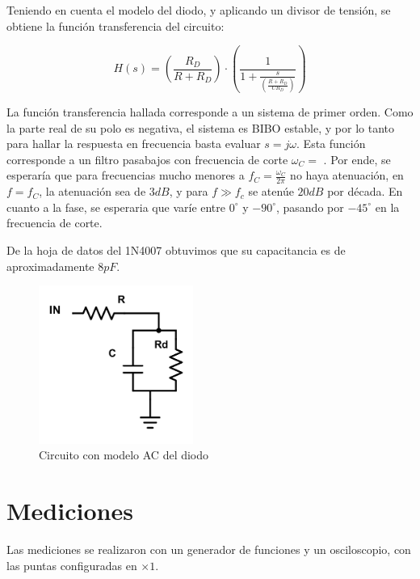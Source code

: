 \documentclass[../../e1_tp1_main.tex]{subfiles}
\begin{document}
Teniendo en cuenta el modelo del diodo, y aplicando un divisor de tensión, se obtiene la funci\'on transferencia del circuito:

\begin{equation}
H(s)= \left(\frac{R_D}{R + R_D} \right) \cdot \left( \frac{1}{1+ \frac{s}{\left(\frac{R+R_D}{C R_D}\right)}}\right)
\end{equation}

La funci\'on transferencia hallada corresponde a un sistema de primer orden. Como la parte real de su polo es negativa, el sistema es BIBO estable, y por lo tanto para hallar la respuesta en frecuencia basta evaluar $s=j\omega$. Esta funci\'on corresponde a un filtro pasabajos con frecuencia de corte $\omega_C = $ . Por ende, se esperar\'ia que para frecuencias mucho menores a $f_C = \frac{\omega_C}{2\pi}$ no haya atenuaci\'on, en $f = f_C$, la atenuaci\'on sea de $3dB$, y para $f\gg f_c$ se aten\'ue $20dB$ por d\'ecada. En cuanto a la fase, se esperaria que var\'ie entre $0^\circ$  y $-90^\circ$, pasando por $-45^\circ$ en la frecuencia de corte. \par

De la hoja de datos del 1N4007 obtuvimos que su capacitancia es de aproximadamente $8pF$.

\begin{figure}[H]
\centering
\includegraphics[width=0.45\textwidth]{imagenes/modCD.png}
\caption{Circuito con modelo AC del diodo}
\end{figure}
\section{Mediciones}

Las mediciones se realizaron con un generador de funciones y un osciloscopio, con las puntas configuradas en $\times 1$.
\end{document}
